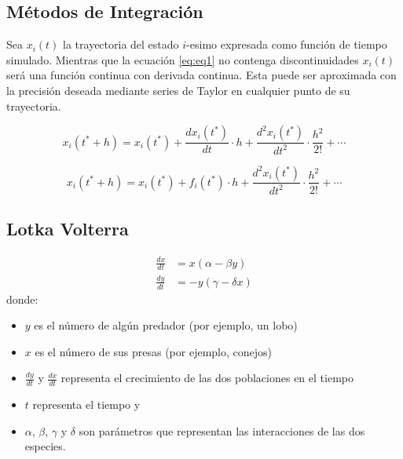 \documentclass{beamer}
\begin{document}
\subsection{Métodos de Integración}
\begin{frame}
	Sea $x_i (t)$ la trayectoria del estado $i$-esimo expresada como función de tiempo simulado. 
	Mientras que la ecuación  \ref{eq:eq1} no contenga discontinuidades $x_i (t)$ será una función continua con derivada continua. 
	Esta puede ser aproximada con la precisión deseada mediante series de Taylor en cualquier punto de su trayectoria.

	\begin{equation} \label{eq3}
		x_i(t^* + h) = x_i(t^*) + \frac{dx_i (t^*)}{dt} \cdot h + \frac{d^{2}x_i (t^*)}{dt^2} \cdot \frac{h^2}{2!} + \cdots
	\end{equation}

	\begin{equation} \label{eq4}
		x_i(t^* + h) = x_i(t^*) + f_i(t^*) \cdot h + \frac{d^{2}x_i (t^*)}{dt^2} \cdot \frac{h^2}{2!} + \cdots
	\end{equation}
\end{frame}

\subsection{Lotka Volterra}
\begin{frame}
	\begin{align*}
		\frac{dx}{dt} &= x(\alpha - \beta y) \\
		\frac{dy}{dt} &= - y(\gamma - \delta  x)
	\end{align*}
	donde:
	\begin{itemize}
		\item $y$ es el número de algún predador (por ejemplo, un lobo)
		\item $x$ es el número de sus presas (por ejemplo, conejos)
		\item $\frac{dy}{dt}$ y $\frac{dx}{dt}$ representa el crecimiento de las dos poblaciones en el tiempo
		\item $t$ representa el tiempo y
		\item $\alpha$, $\beta$, $\gamma$ y $\delta$ son parámetros que representan las interacciones de las dos especies.
	\end{itemize}
\end{frame}

\end{document}
